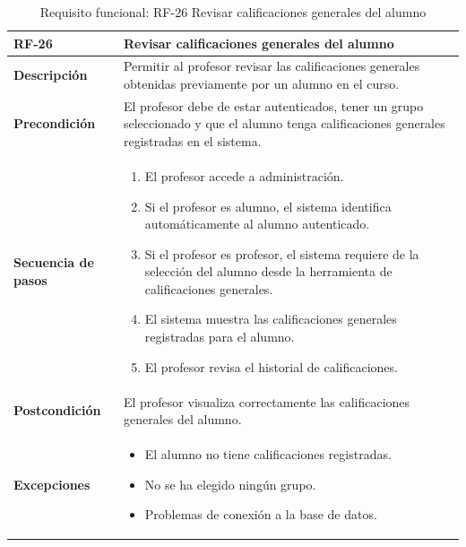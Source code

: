 \begin{table}[H]
\centering
\begin{tabularx}{\textwidth}{
  |>{\centering\arraybackslash}l
  |>{\centering\arraybackslash}X|}
\hline
\textbf{RF-26} & \textbf{Revisar calificaciones generales del alumno} \\ \hline

\textbf{Descripción} & Permitir al profesor revisar las calificaciones generales obtenidas previamente por un alumno en el curso. \\ \hline

\textbf{Precondición} & El profesor debe de estar autenticados, tener un grupo seleccionado y que el alumno tenga calificaciones generales registradas en el sistema. \\ \hline

\textbf{Secuencia de pasos} &
\begin{enumerate}
  \item El profesor accede a administración.
  \item Si el profesor es alumno, el sistema identifica automáticamente al alumno autenticado.
  \item Si el profesor es profesor, el sistema requiere de la selección del alumno desde la herramienta de calificaciones generales.
  \item El sistema muestra las calificaciones generales registradas para el alumno.
  \item El profesor revisa el historial de calificaciones.
\end{enumerate} \\ \hline

\textbf{Postcondición} & El profesor visualiza correctamente las calificaciones generales del alumno. \\ \hline

\textbf{Excepciones} &
\begin{itemize}
  \item El alumno no tiene calificaciones registradas.
  \item No se ha elegido ningún grupo.
  \item Problemas de conexión a la base de datos.
\end{itemize} \\ \hline
\end{tabularx}
\caption{Requisito funcional: RF-26 Revisar calificaciones generales del alumno}
\label{tab:RF-26}
\end{table}
